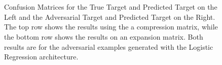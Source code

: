 \documentclass{asaproc}
\begin{document}
\begin{figure}[h!]
	\centering
	\caption{\enspace Confusion Matrices for the True Target and Predicted Target on the Left and the Adversarial Target and Predicted Target on the Right. The top row shows the results using the a compression matrix, while the bottom row shows the results on an expansion matrix. Both results are for the adversarial examples generated with the Logistic Regression architecture.}
	   \\
	   \\
	\label{fig2}
\end{figure}
\end{document}
